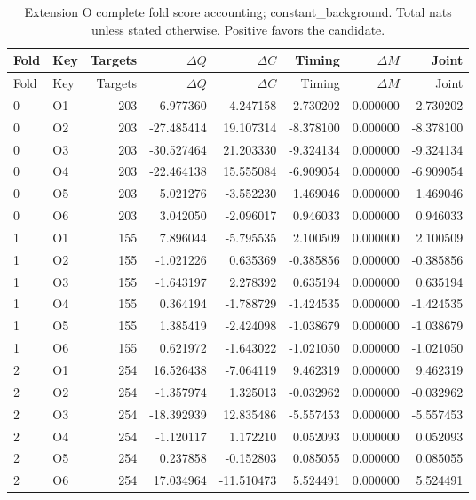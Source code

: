 {\small
\setlength{\tabcolsep}{3pt}
\begin{longtable}{llrrrrrr}
\caption{Extension O complete fold score accounting; constant\_background. Total nats unless stated otherwise. Positive favors the candidate.}\label{tab:O-constant_background}\\
\toprule
Fold & Key & Targets & $\Delta Q$ & $\Delta C$ & Timing & $\Delta M$ & Joint\\\midrule
\endfirsthead
\toprule
Fold & Key & Targets & $\Delta Q$ & $\Delta C$ & Timing & $\Delta M$ & Joint\\\midrule
\endhead
0 & O1 & 203 & 6.977360 & -4.247158 & 2.730202 & 0.000000 & 2.730202\\
0 & O2 & 203 & -27.485414 & 19.107314 & -8.378100 & 0.000000 & -8.378100\\
0 & O3 & 203 & -30.527464 & 21.203330 & -9.324134 & 0.000000 & -9.324134\\
0 & O4 & 203 & -22.464138 & 15.555084 & -6.909054 & 0.000000 & -6.909054\\
0 & O5 & 203 & 5.021276 & -3.552230 & 1.469046 & 0.000000 & 1.469046\\
0 & O6 & 203 & 3.042050 & -2.096017 & 0.946033 & 0.000000 & 0.946033\\
1 & O1 & 155 & 7.896044 & -5.795535 & 2.100509 & 0.000000 & 2.100509\\
1 & O2 & 155 & -1.021226 & 0.635369 & -0.385856 & 0.000000 & -0.385856\\
1 & O3 & 155 & -1.643197 & 2.278392 & 0.635194 & 0.000000 & 0.635194\\
1 & O4 & 155 & 0.364194 & -1.788729 & -1.424535 & 0.000000 & -1.424535\\
1 & O5 & 155 & 1.385419 & -2.424098 & -1.038679 & 0.000000 & -1.038679\\
1 & O6 & 155 & 0.621972 & -1.643022 & -1.021050 & 0.000000 & -1.021050\\
2 & O1 & 254 & 16.526438 & -7.064119 & 9.462319 & 0.000000 & 9.462319\\
2 & O2 & 254 & -1.357974 & 1.325013 & -0.032962 & 0.000000 & -0.032962\\
2 & O3 & 254 & -18.392939 & 12.835486 & -5.557453 & 0.000000 & -5.557453\\
2 & O4 & 254 & -1.120117 & 1.172210 & 0.052093 & 0.000000 & 0.052093\\
2 & O5 & 254 & 0.237858 & -0.152803 & 0.085055 & 0.000000 & 0.085055\\
2 & O6 & 254 & 17.034964 & -11.510473 & 5.524491 & 0.000000 & 5.524491\\
\bottomrule
\end{longtable}
}

